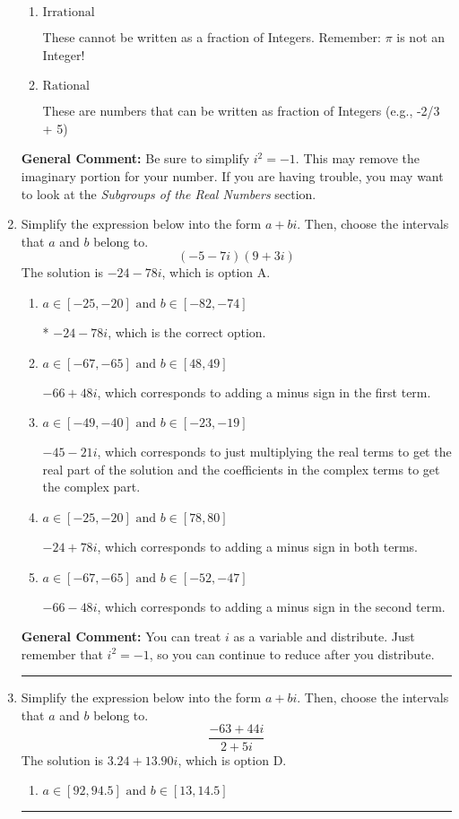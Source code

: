 \documentclass{extbook}[14pt]
\newcommand{\litem}[1]{\item #1

\rule{\textwidth}{0.4pt}}
\begin{document}
\begin{enumerate}
{\begin{enumerate}[label=\Alph*.]
This is a Complex number $(a+bi)$ that \textbf{only} has an imaginary part like $2i$.
\item \( \text{Irrational} \)

These cannot be written as a fraction of Integers. Remember: $\pi$ is not an Integer!
\item \( \text{Rational} \)

These are numbers that can be written as fraction of Integers (e.g., -2/3 + 5)
\end{enumerate}

\textbf{General Comment:} Be sure to simplify $i^2 = -1$. This may remove the imaginary portion for your number. If you are having trouble, you may want to look at the \textit{Subgroups of the Real Numbers} section.
}
\litem{
Simplify the expression below into the form $a+bi$. Then, choose the intervals that $a$ and $b$ belong to.
\[ (-5 - 7 i)(9 + 3 i) \]
The solution is \( -24 - 78 i \), which is option A.\begin{enumerate}[label=\Alph*.]
\item \( a \in [-25, -20] \text{ and } b \in [-82, -74] \)

* $-24 - 78 i$, which is the correct option.
\item \( a \in [-67, -65] \text{ and } b \in [48, 49] \)

 $-66 + 48 i$, which corresponds to adding a minus sign in the first term.
\item \( a \in [-49, -40] \text{ and } b \in [-23, -19] \)

 $-45 - 21 i$, which corresponds to just multiplying the real terms to get the real part of the solution and the coefficients in the complex terms to get the complex part.
\item \( a \in [-25, -20] \text{ and } b \in [78, 80] \)

 $-24 + 78 i$, which corresponds to adding a minus sign in both terms.
\item \( a \in [-67, -65] \text{ and } b \in [-52, -47] \)

 $-66 - 48 i$, which corresponds to adding a minus sign in the second term.
\end{enumerate}

\textbf{General Comment:} You can treat $i$ as a variable and distribute. Just remember that $i^2=-1$, so you can continue to reduce after you distribute.
}
\litem{
Simplify the expression below into the form $a+bi$. Then, choose the intervals that $a$ and $b$ belong to.
\[ \frac{-63 + 44 i}{2 + 5 i} \]
The solution is \( 3.24  + 13.90 i \), which is option D.\begin{enumerate}[label=\Alph*.]
\item \( a \in [92, 94.5] \text{ and } b \in [13, 14.5] \)


\end{enumerate}}
\end{enumerate}
\end{document}
